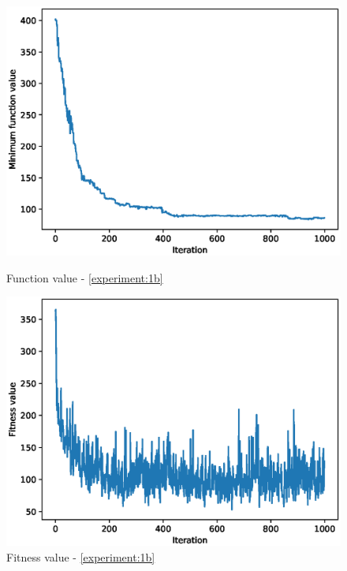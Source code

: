 \documentclass{article}
\begin{document}
\begin{figure}[!htbp]
	\centering
	\begin{minipage}{.48\textwidth}
		\centering
		\includegraphics[scale=.4]{experiment_1b_rastrigin/min_eval_0.eps}
		\caption{Function value - \ref{experiment:1b}}
	\end{minipage}\hfill
	\begin{minipage}{.48\textwidth}
		\centering
		\includegraphics[scale=.4]{experiment_1b_rastrigin/max_fitness_0.eps}
		\caption{Fitness value - \ref{experiment:1b}}
	\end{minipage}
\end{figure}
\FloatBarrier
\end{document}
